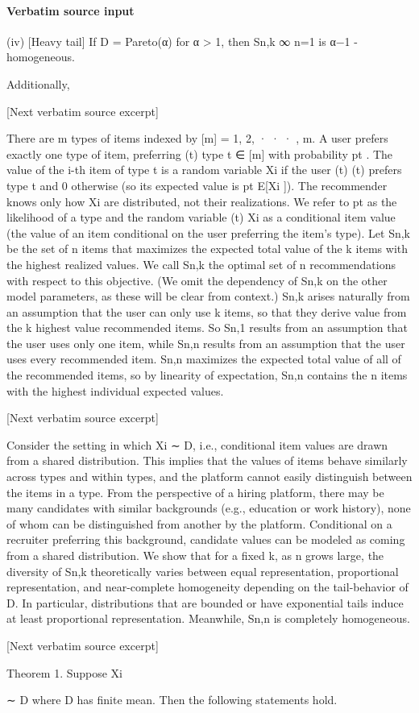 \documentclass[10pt]{article}
\begin{document}
\paragraph{Verbatim source input}
\begin{ReviewVerbatim}
(iv) [Heavy tail] If D = Pareto(α) for α > 1, then {Sn,k }∞
n=1 is α−1 -homogeneous.

Additionally,

[Next verbatim source excerpt]

There are m types of items indexed by [m] = {1, 2, · · · , m}. A user prefers exactly one type of item, preferring
(t)
type t ∈ [m] with probability pt . The value of the i-th item of type t is a random variable Xi if the user
(t)
(t)
prefers type t and 0 otherwise (so its expected value is pt E[Xi ]). The recommender knows only how Xi
are distributed, not their realizations. We refer to pt as the likelihood of a type and the random variable
(t)
Xi as a conditional item value (the value of an item conditional on the user preferring the item’s type).
Let Sn,k be the set of n items that maximizes the expected total value of the k items with the highest
realized values. We call Sn,k the optimal set of n recommendations with respect to this objective. (We omit
the dependency of Sn,k on the other model parameters, as these will be clear from context.)
Sn,k arises naturally from an assumption that the user can only use k items, so that they derive value
from the k highest value recommended items. So Sn,1 results from an assumption that the user uses only
one item, while Sn,n results from an assumption that the user uses every recommended item.
Sn,n maximizes the expected total value of all of the recommended items, so by linearity of expectation,
Sn,n contains the n items with the highest individual expected values.

[Next verbatim source excerpt]

Consider the setting in which Xi ∼ D, i.e., conditional item values are drawn from a shared distribution.
This implies that the values of items behave similarly across types and within types, and the platform cannot
easily distinguish between the items in a type. From the perspective of a hiring platform, there may be many
candidates with similar backgrounds (e.g., education or work history), none of whom can be distinguished
from another by the platform. Conditional on a recruiter preferring this background, candidate values can
be modeled as coming from a shared distribution.
We show that for a fixed k, as n grows large, the diversity of Sn,k theoretically varies between equal
representation, proportional representation, and near-complete homogeneity depending on the tail-behavior
of D. In particular, distributions that are bounded or have exponential tails induce at least proportional
representation. Meanwhile, Sn,n is completely homogeneous.

[Next verbatim source excerpt]

Theorem 1. Suppose Xi

∼ D where D has finite mean. Then the following statements hold.
\end{ReviewVerbatim}
\end{document}
